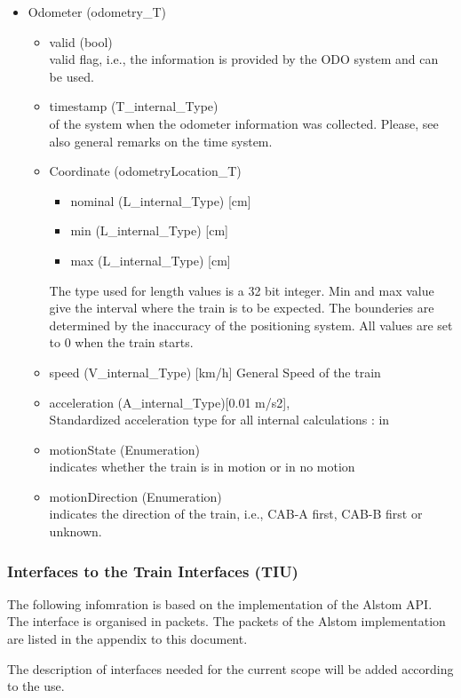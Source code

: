 \documentclass{template/openetcs_report}
\begin{document}
\begin{itemize}
\item Odometer (odometry\_T)
\begin{itemize}
\item valid (bool)\\
valid flag, i.e., the information is provided by the ODO system and can be used.
\item timestamp (T\_internal\_Type)\\
of the system when the odometer information was collected. Please, see also general remarks on the time system. 
\item Coordinate (odometryLocation\_T)
\begin{itemize}
\item nominal (L\_internal\_Type) [cm]
\item min (L\_internal\_Type) [cm]
\item max (L\_internal\_Type) [cm]
\end{itemize}
The type used for length values is a 32 bit integer. 
Min and max value give the interval where the train is to be expected. The bounderies are determined by the inaccuracy of the positioning system. All values are set to 0 when the train starts.
\item speed (V\_internal\_Type) [km/h]
General Speed of the train
\item acceleration (A\_internal\_Type)[0.01 m/s2],\\
Standardized acceleration type for all internal calculations : in 
\item motionState (Enumeration)\\
indicates whether the train is in motion or in no motion
\item motionDirection (Enumeration)\\
indicates the direction of the train, i.e., CAB-A first, CAB-B first or unknown.
\end{itemize}
\end{itemize}

\subsubsection{Interfaces to the Train Interfaces (TIU)}
The following infomration is based on the implementation of the Alstom API. The interface is organised in packets. The packets of the Alstom implementation are listed in the appendix to this document.

The description of interfaces needed for the current scope will be added according to the use.
\end{document}
